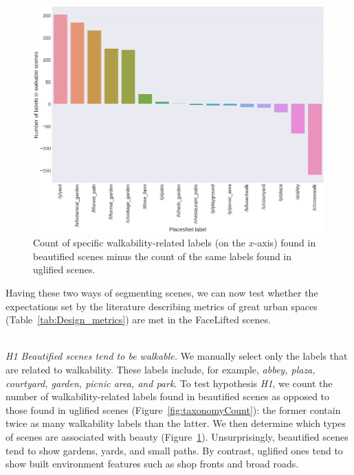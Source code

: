 \begin{figure}[h]
	\centering
	\includegraphics[width=\columnwidth]{Plot/walkable_taxonomy.png}
	\caption{Count of specific walkability-related labels  (on the $x$-axis) found in beautified scenes minus the count of the same labels found in uglified scenes.}
	\label{fig:WalkableTnomy}
\end{figure}


Having these two ways of segmenting scenes, we can now test whether the expectations set by the literature describing metrics of great urban spaces (Table~\ref{tab:Design_metrics}) are  met in the FaceLifted scenes. 


\mbox{ } \\
\noindent
\emph{H1 Beautified scenes tend to be walkable.}
We manually select only the labels that are related to walkability. These labels include, for example, \textit{abbey, plaza, courtyard, garden, picnic area, \textrm{and} park}. To test hypothesis \emph{H1}, we count the number of walkability-related labels found in beautified scenes as opposed to those found in uglified scenes (Figure~\ref{fig:taxonomyCount}): the former contain twice as many walkability labels than the latter. We then determine which types of scenes are associated with beauty (Figure~\ref{fig:WalkableTnomy}). Unsurprisingly, beautified scenes tend to show gardens, yards, and small paths. By contrast, uglified ones tend to show built environment features such as shop fronts and broad roads. 


